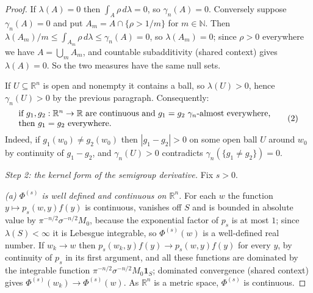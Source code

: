 \begin{proof}
If $\lambda(A) = 0$ then $\int_A\rho\,d\lambda = 0$, so $\gamma_n(A) = 0$.
Conversely suppose $\gamma_n(A) = 0$ and put $A_m = A\cap\{\rho>1/m\}$ for
$m \in \mathbb{N}$.  Then
$\lambda(A_m)/m \leq \int_{A_m}\rho\,d\lambda \leq \gamma_n(A) = 0$, so
$\lambda(A_m) = 0$; since $\rho > 0$ everywhere we have $A = \bigcup_m A_m$, and
countable subadditivity (shared context) gives $\lambda(A) = 0$.  So the two
measures have the same null sets.

If $U \subseteq \mathbb{R}^n$ is open and nonempty it contains a ball, so
$\lambda(U) > 0$, hence $\gamma_n(U) > 0$ by the previous paragraph.
Consequently:
\begin{equation*}
  \parbox{0.86\textwidth}{if $g_1,g_2 : \mathbb{R}^n \to \mathbb{R}$ are
  continuous and $g_1 = g_2$ $\gamma_n$-almost everywhere, then $g_1 = g_2$
  everywhere.} \tag{2}
\end{equation*}
Indeed, if $g_1(w_0) \neq g_2(w_0)$ then $|g_1-g_2| > 0$ on some open ball $U$
around $w_0$ by continuity of $g_1-g_2$, and $\gamma_n(U) > 0$ contradicts
$\gamma_n(\{g_1 \neq g_2\}) = 0$.

\emph{Step 2: the kernel form of the semigroup derivative.}
Fix $s > 0$.

\emph{(a) $\Phi^{(s)}$ is well defined and continuous on $\mathbb{R}^n$.}
For each $w$ the function $y \mapsto p_s(w,y)f(y)$ is continuous, vanishes off
$S$ and is bounded in absolute value by $\pi^{-n/2}\sigma^{-n/2}M_0$, because
the exponential factor of $p_s$ is at most $1$; since $\lambda(S) < \infty$ it
is Lebesgue integrable, so $\Phi^{(s)}(w)$ is a well-defined real number.  If
$w_k \to w$ then $p_s(w_k,y)f(y) \to p_s(w,y)f(y)$ for every $y$, by continuity
of $p_s$ in its first argument, and all these functions are dominated by the
integrable function $\pi^{-n/2}\sigma^{-n/2}M_0\mathbf 1_S$; dominated
convergence (shared context) gives $\Phi^{(s)}(w_k) \to \Phi^{(s)}(w)$.  As
$\mathbb{R}^n$ is a metric space, $\Phi^{(s)}$ is continuous.


\end{proof}
